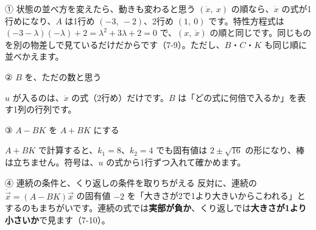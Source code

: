 
\begin{tsumazuki}{① 状態の並べ方を変えたら、動きも変わると思う}
$(\dot x,\ x)$ の順なら、$\dot x$ の式が1行めになり、$A$ は1行め $(-3,\ -2)$、2行め $(1,\ 0)$ です。特性方程式は $(-3-\lambda)(-\lambda)+2=\lambda^2+3\lambda+2=0$ で、$(x,\ \dot x)$ の順と同じです。同じものを別の物差しで見ているだけだからです（7-9）。ただし、$B$・$C$・$K$ も同じ順に並べかえます。
\end{tsumazuki}

\begingroup{}%
\noindent\begin{minipage}[t]{0.485\linewidth}\vspace{0pt}
\begin{tsumazuki}{② $B$ を、ただの数と思う}
\raggedright{}
$u$ が入るのは、$\ddot x$ の式（2行め）だけです。$B$ は「どの式に何倍で入るか」を表す1列の行列です。
\end{tsumazuki}
\end{minipage}\hfill
\begin{minipage}[t]{0.485\linewidth}\vspace{0pt}
\begin{tsumazuki}{③ $A-BK$ を $A+BK$ にする}
\raggedright{}
$A+BK$ で計算すると、$k_1=8$、$k_2=4$ でも固有値は $2\pm\sqrt{16}$ の形になり、棒は立ちません。符号は、$u$ の式から1行ずつ入れて確かめます。
\end{tsumazuki}
\end{minipage}\par
\endgroup

\begin{tsumazuki}{④ 連続の条件と、くり返しの条件を取りちがえる}
反対に、連続の $\dot{\vec x}=(A-BK)\vec x$ の固有値 $-2$ を「大きさが2で1より大きいからこわれる」とするのもまちがいです。連続の式では\textbf{実部が負か}、くり返しでは\textbf{大きさが1より小さいか}で見ます（7-10）。
\end{tsumazuki}

